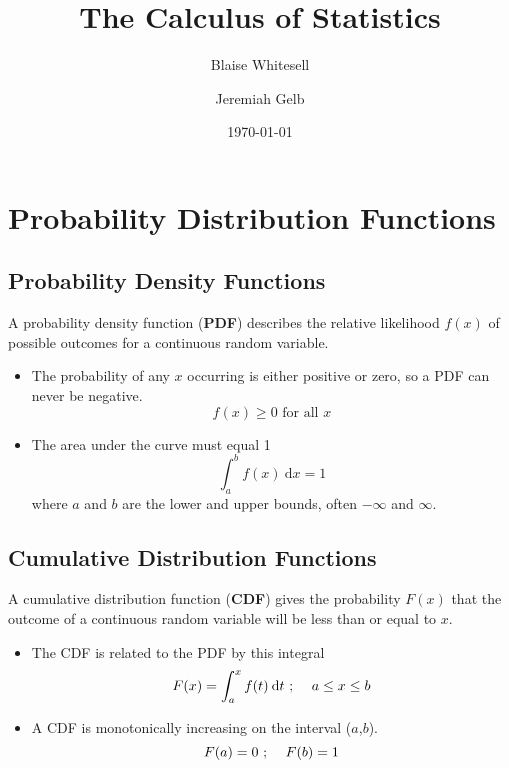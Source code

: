 \documentclass[12pt,letterpaper]{article}
\title{The Calculus of Statistics%
}
\author{Blaise Whitesell \and Jeremiah Gelb}
\date{\today}
\begin{document}
\newcommand{\bdef}[1]{\textbf{#1}} %
\newcommand{\dx}{\:\mathrm{d}x} %
\newcommand{\dt}{\:\mathrm{d}t} %
\newcommand{\eqnsc}{\text{ ; \quad}} %
\maketitle
\section{Probability Distribution Functions}
\subsection{Probability Density Functions}
A probability density function (\bdef{PDF}) describes the relative likelihood $f(x)$ of possible outcomes for a continuous random variable.
\begin{itemize}
\item The probability of any $x$ occurring is either positive or zero, so a PDF can never be negative.
\begin{equation*}
f(x) \geq 0 \text{ for all }x
\end{equation*}
\item The area under the curve must equal 1
\begin{equation*}
\int_a^b f(x)\dx = 1
\end{equation*}
where $a$ and $b$ are the lower and upper bounds, often $-\infty$ and $\infty$.
\end{itemize}
\subsection{Cumulative Distribution Functions}
A cumulative distribution function (\bdef{CDF}) gives the probability $F(x)$ that the outcome of a continuous random variable will be less than or equal to $x$.
\begin{itemize}
\item The CDF is related to the PDF by this integral
\begin{equation*}
F(x) = \int_a^x f(t) \dt \eqnsc a \leq x \leq b
\end{equation*}
\item A CDF is monotonically increasing on the interval ($a$,$b$).
\begin{equation*}
F(a) = 0 \eqnsc F(b) = 1
\end{equation*}
\end{itemize}
\end{document}
